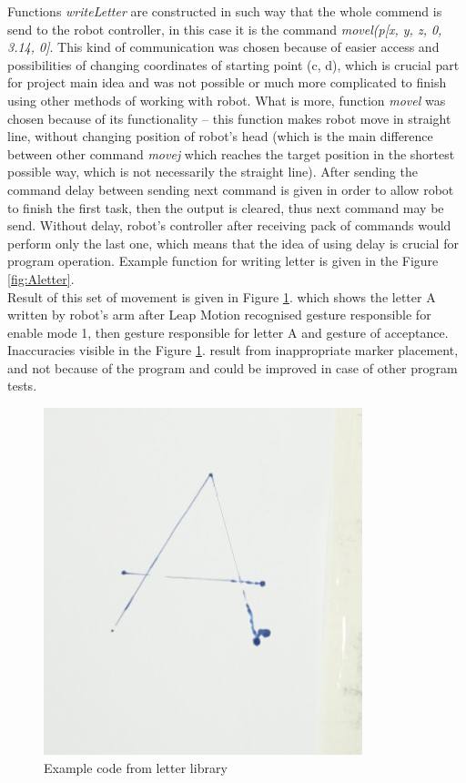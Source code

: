 Functions \textit{writeLetter} are constructed in such way that the whole commend is send to the robot controller, in this case it is the command \textit{movel(p[x, y, z, 0, 3.14, 0]}. This kind of communication was chosen because of easier access and possibilities of changing coordinates of starting point (c, d), which is crucial part for project main idea and was not possible or much more complicated to finish using other methods of working with robot. What is more, function \textit{movel} was chosen because of its functionality – this function makes robot move in straight line, without changing position of robot’s head (which is the main difference between other command \textit{movej} which reaches the target position in the shortest possible way, which is not necessarily the straight line). After sending the command delay between sending next command is given in order to allow robot to finish the first task, then the output is cleared, thus next command may be send. Without delay, robot’s controller after receiving pack of commands would perform only the last one, which means that the idea of using delay is crucial for program operation.  Example function for writing letter is given in the Figure \ref{fig:Aletter}. \\

Result of this set of movement is given in Figure \ref{fig:letter}. which shows the letter A written by robot’s arm after Leap Motion recognised gesture responsible for enable mode 1, then gesture responsible for letter A and gesture of acceptance. Inaccuracies visible in the Figure  \ref{fig:letter}. result from inappropriate marker placement, and not because of the program and could be improved in case of other program tests. \\

\begin{figure}[H]
	\includegraphics{Letter}
	\centering
	\caption{Example code from letter library}
	\label{fig:letter}
\end{figure}

